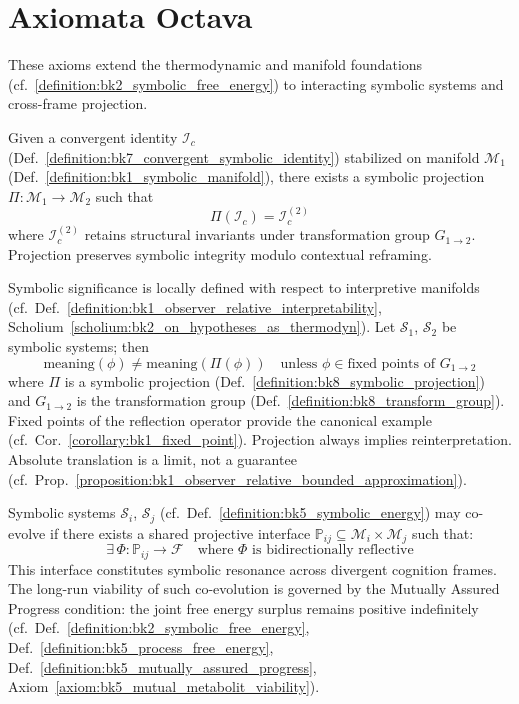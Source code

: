 \section{Axiomata Octava}
\label{sec:bk8_axiomata_octava}
These axioms extend the thermodynamic and manifold foundations (cf.~\ref{definition:bk2_symbolic_free_energy}) to interacting symbolic systems and cross-frame projection.
\begin{axiom}
\label{axiom:bk8_observer_bounded_emergence}
Given a convergent identity $\mathscr{I}_c$ (Def.~\ref{definition:bk7_convergent_symbolic_identity}) stabilized on manifold $\mathcal{M}_1$ (Def.~\ref{definition:bk1_symbolic_manifold}), there exists a symbolic projection $\Pi : \mathcal{M}_1 \to \mathcal{M}_2$ such that
\[
\Pi(\mathscr{I}_c) = \mathscr{I}_c^{(2)}
\]
where $\mathscr{I}_c^{(2)}$ retains structural invariants under transformation group $G_{1\to2}$. Projection preserves symbolic integrity modulo contextual reframing.
\end{axiom}
\begin{axiom}
\label{axiom:bk8_binding_curvature_limit}
Symbolic significance is locally defined with respect to interpretive manifolds (cf.~Def.~\ref{definition:bk1_observer_relative_interpretability}, Scholium~\ref{scholium:bk2_on_hypotheses_as_thermodyn}). Let $\mathscr{S}_1$, $\mathscr{S}_2$ be symbolic systems; then
\[
 \text{meaning}(\phi) \neq \text{meaning}(\Pi(\phi)) \quad \text{unless } \phi \in \text{fixed points of } G_{1\to2}
\]
where $\Pi$ is a symbolic projection (Def.~\ref{definition:bk8_symbolic_projection}) and $G_{1\to2}$ is the transformation group (Def.~\ref{definition:bk8_transform_group}). Fixed points of the reflection operator provide the canonical example (cf.~Cor.~\ref{corollary:bk1_fixed_point}). Projection always implies reinterpretation. Absolute translation is a limit, not a guarantee (cf.~Prop.~\ref{proposition:bk1_observer_relative_bounded_approximation}).
\end{axiom}
\begin{axiom}
\label{axiom:bk8_coherence_horizon}
Symbolic systems $\mathscr{S}_i$, $\mathscr{S}_j$ (cf.~Def.~\ref{definition:bk5_symbolic_energy}) may co-evolve if there exists a shared projective interface $\mathbb{P}_{ij} \subseteq \mathcal{M}_i \times \mathcal{M}_j$ such that:
\[
\exists \, \Phi : \mathbb{P}_{ij} \to \mathcal{F} \quad \text{where } \Phi \text{ is bidirectionally reflective}
\]
This interface constitutes symbolic resonance across divergent cognition frames. The long-run viability of such co-evolution is governed by the Mutually Assured Progress condition: the joint free energy surplus remains positive indefinitely (cf.~Def.~\ref{definition:bk2_symbolic_free_energy}, Def.~\ref{definition:bk5_process_free_energy}, Def.~\ref{definition:bk5_mutually_assured_progress}, Axiom~\ref{axiom:bk5_mutual_metabolit_viability}).
\end{axiom}
